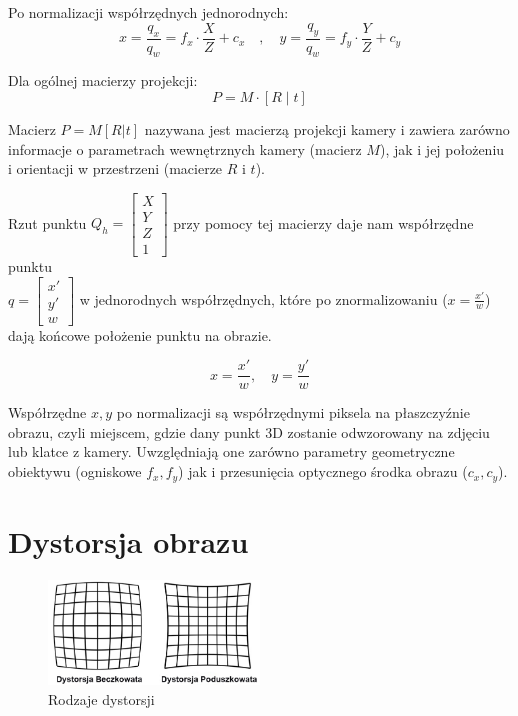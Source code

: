 \documentclass[magisterska]{pracadypl}
\begin{document}
Po normalizacji współrzędnych jednorodnych:
\[
x = \frac{q_x}{q_w} = f_x \cdot \frac{X}{Z} + c_x
\quad , \quad
y = \frac{q_y}{q_w} = f_y \cdot \frac{Y}{Z} + c_y
\]

Dla ogólnej macierzy projekcji:
\[
P = M \cdot [R \;|\; t]
\]

Macierz \( P = M[R | t] \) nazywana jest macierzą projekcji kamery i zawiera zarówno informacje o parametrach wewnętrznych kamery (macierz \( M \)), jak i jej położeniu i orientacji w przestrzeni (macierze \( R \) i \( t \)).

Rzut punktu \( Q_h = \begin{bmatrix} X \\ Y \\ Z \\ 1 \end{bmatrix} \) przy pomocy tej macierzy daje nam współrzędne punktu\\ \( q = \begin{bmatrix} x' \\ y' \\ w \end{bmatrix} \) w jednorodnych współrzędnych, które po znormalizowaniu (\( x = \frac{x'}{w} \)) dają końcowe położenie punktu na obrazie.

\[
x = \frac{x'}{w}, \quad y = \frac{y'}{w}
\]

Współrzędne \( x, y \) po normalizacji są współrzędnymi piksela na płaszczyźnie obrazu, czyli miejscem, gdzie dany punkt 3D zostanie odwzorowany na zdjęciu lub klatce z kamery. Uwzględniają one zarówno parametry geometryczne obiektywu (ogniskowe \( f_x, f_y \)) jak i przesunięcia optycznego środka obrazu (\( c_x, c_y \)).

\section{Dystorsja obrazu}

\begin{figure}[H]  %
    \centering  %
    \includegraphics[width=0.5\textwidth]{images/dystorsje.png}  %
    \captionsetup{font=footnotesize}
    \caption[Rodzaje dystorsji. https://beafoto.pl/dystorsja]{Rodzaje dystorsji}
    \label{fig:rpi}  %
\end{figure}
\end{document}
